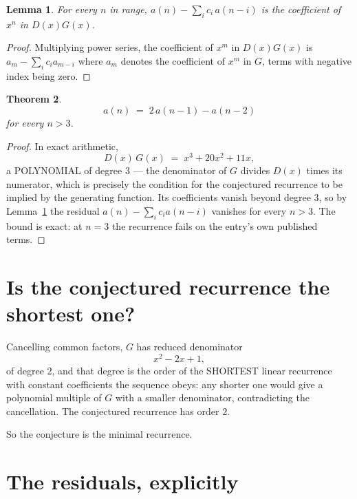 \documentclass[11pt,a4paper]{article}
\theoremstyle{plain}
\newtheorem{theorem}{Theorem}
\newtheorem{lemma}[theorem]{Lemma}
\theoremstyle{definition}
\begin{document}
\begin{lemma}\label{lem:key}
For every $n$ in range, $a(n)-\sum_i c_i\,a(n-i)$ is the coefficient of $x^{n}$ in
$D(x)G(x)$.
\end{lemma}

\begin{proof}
Multiplying power series, the coefficient of $x^{m}$ in $D(x)G(x)$ is
$a_m-\sum_i c_i a_{m-i}$ where $a_m$ denotes the coefficient of $x^{m}$ in $G$, terms with
negative index being zero.
\end{proof}

\begin{theorem}
\[
a(n)\;=\;2\,a(n-1) - a(n-2)
\]
for every $n>3$.
\end{theorem}

\begin{proof}
In exact arithmetic,
\[
D(x)\,G(x)\;=\;x^{3} + 20 x^{2} + 11 x,
\]
a POLYNOMIAL of degree $3$ --- the denominator of $G$ divides $D(x)$ times its numerator,
which is precisely the condition for the conjectured recurrence to be implied by the
generating function. Its coefficients vanish beyond degree $3$, so by
Lemma~\ref{lem:key} the residual $a(n)-\sum_ic_ia(n-i)$ vanishes for every
$n>3$. The bound is exact: at $n=3$ the recurrence fails on the entry's own published terms.
\end{proof}

\section{Is the conjectured recurrence the shortest one?}

Cancelling common factors, $G$ has reduced denominator
\[
x^{2} - 2 x + 1,
\]
of degree $2$, and that degree is the order of the SHORTEST linear recurrence with
constant coefficients the sequence obeys: any shorter one would give a polynomial multiple of
$G$ with a smaller denominator, contradicting the cancellation. The conjectured recurrence has
order $2$.

So the conjecture is the minimal recurrence.

\section{The residuals, explicitly}
\end{document}
